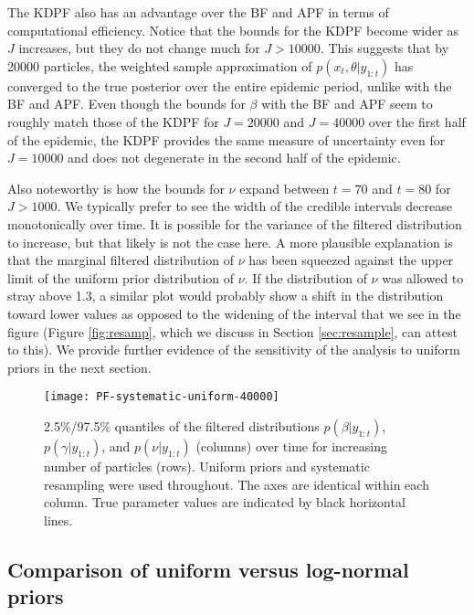 \documentclass{elsarticle}
\begin{document}
The KDPF also has an advantage over the BF and APF in terms of computational efficiency. Notice that the bounds for the KDPF become wider as $J$ increases, but they do not change much for $J > 10000$. This suggests that by 20000 particles, the weighted sample approximation of $p(x_t,\theta|y_{1:t})$ has converged to the true posterior over the entire epidemic period, unlike with the BF and APF. Even though the bounds for $\beta$ with the BF and APF seem to roughly match those of the KDPF for $J = 20000$ and $J = 40000$ over the first half of the epidemic, the KDPF provides the same measure of uncertainty even for $J = 10000$ and does not degenerate in the second half of the epidemic.

Also noteworthy is how the bounds for $\nu$ expand between $t = 70$ and $t = 80$ for $J > 1000$. We typically prefer to see the width of the credible intervals decrease monotonically over time. It is possible for the variance of the filtered distribution to increase, but that likely is not the case here. A more plausible explanation is that the marginal filtered distribution of $\nu$ has been squeezed against the upper limit of the uniform prior distribution of $\nu$. If the distribution of $\nu$ was allowed to stray above 1.3, a similar plot would probably show a shift in the distribution toward lower values as opposed to the widening of the interval that we see in the figure (Figure \ref{fig:resamp}, which we discuss in Section \ref{sec:resample}, can attest to this). We provide further evidence of the sensitivity of the analysis to uniform priors in the next section.

\begin{figure}
\centering
\texttt{[image: PF-systematic-uniform-40000]}
\caption{2.5\%/97.5\% quantiles of the filtered distributions $p(\beta|y_{1:t})$, $p(\gamma|y_{1:t})$, and $p(\nu|y_{1:t})$ (columns) over time for increasing number of particles (rows). Uniform priors and systematic resampling were used throughout. The axes are identical within each column. True parameter values are indicated by black horizontal lines.} \label{fig:pfs}
\end{figure}

\subsection{Comparison of uniform versus log-normal priors}
\end{document}

